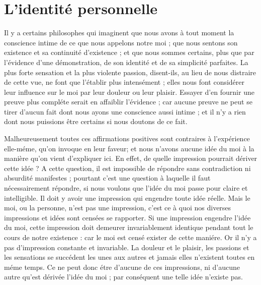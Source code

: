 
\section{L'identité personnelle}
Il y a certains philosophes qui imaginent que nous
avons à tout moment la conscience intime de ce que nous
appelons notre moi ; que nous sentons son existence et sa
continuité d’existence ; et que nous sommes certains,
plus que par l’évidence d’une démonstration, de son identité
et de sa simplicité parfaites. La plus forte sensation
et la plus violente passion, disent-ils, au lieu de nous
distraire de cette vue, ne font que l’établir plus intensément ;
elles nous font considérer leur influence sur le moi
par leur douleur ou leur plaisir. Essayer d’en fournir une
preuve plus compléte serait en affaiblir l’évidence ; car
aucune preuve ne peut se tirer d’aucun fait dont nous
ayons une conscience aussi intime ; et il n’y a rien dont
nous puissions être certains si nous doutons de ce fait.

Malheureusement toutes ces affirmations positives sont
contraires à l’expérience elle-méme, qu’on invoque en
leur faveur; et nous n’avons aucune idée du moi à la
manière qu’on vient d’expliquer ici. En effet, de quelle
impression pourrait dériver cette idée ? A cette question,
il est impossible de répondre sans contradiction ni absurdité
manifestes ; pourtant c’est une question à laquelle
il faut nécessairement répondre, si nous voulons que l’idée
du moi passe pour claire et intelligible. Il doit y avoir une
impression qui engendre toute idée réelle. Mais le moi,
ou la personne, n’est pas une impression, c’est ce à quoi
nos diverses impressions et idées sont censées se rapporter.
Si une impression engendre l’idée du moi, cette impression
doit demeurer invariablement identique pendant tout le
cours de notre existence : car le moi est censé exister de
cette maniére. Or il n’y a pas d’impression constante et
invariable. La douleur et le plaisir, les passions et les
sensations se succédent les unes aux autres et jamais elles
n’existent toutes en méme temps. Ce ne peut donc étre
d’aucune de ces impressions, ni d’aucune autre qu’est
dérivée l’idée du moi ; par conséquent une telle idée n’existe
pas.

